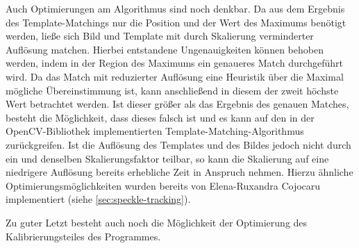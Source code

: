 Auch Optimierungen am Algorithmus sind noch denkbar. Da aus dem Ergebnis des Template-Matchings nur die Position und der Wert des Maximums benötigt werden, ließe sich Bild und Template mit durch Skalierung verminderter Auflösung matchen. Hierbei entstandene Ungenauigkeiten können behoben werden, indem in der Region des Maximums ein genaueres Match durchgeführt wird. Da das Match mit reduzierter Auflösung eine Heuristik über die Maximal mögliche Übereinstimmung ist, kann anschließend in diesem der zweit höchste Wert betrachtet werden. Ist dieser größer als das Ergebnis des genauen Matches, besteht die Möglichkeit, dass dieses falsch ist und es kann auf den in der OpenCV-Bibliothek implementierten Template-Matching-Algorithmus zurückgreifen. Ist die Auflösung des Templates und des Bildes jedoch nicht durch ein und denselben Skalierungsfaktor teilbar, so kann die Skalierung auf eine niedrigere Auflösung bereits erhebliche Zeit in Anspruch nehmen. Hierzu ähnliche Optimierungsmöglichkeiten wurden bereits von Elena-Ruxandra Cojocaru implementiert (siehe \ref{sec:speckle-tracking}). 

Zu guter Letzt besteht auch noch die Möglichkeit der Optimierung des Kalibrierungsteiles des Programmes. 